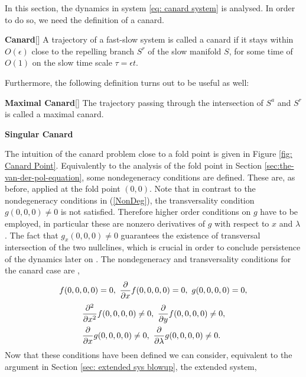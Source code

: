 In this section, the dynamics in system \ref{eq: canard system} is analysed. In order to do so, we need the definition of a canard.
\begin{definition}{\textbf{ Canard}}[\citealp{Kuehn}]
A trajectory of a fast-slow system is called a canard if it stays within $O(\epsilon)$ close to the repelling branch $S^r$ of the slow manifold $S$, for some time of $O(1)$ on the slow time scale $\tau = \epsilon t$.
\end{definition}
Furthermore, the following definition turns out to be useful as well:
\begin{definition}{\textbf{Maximal Canard}}[\citealp{Kuehn}] \label{maxcanard}
The trajectory passing through the intersection of $S^a$ and $S^r$ is called a maximal canard. 
\end{definition}
\begin{definition}{\textbf{Singular Canard}}
\end{definition}
The intuition of the canard problem close to a fold point is given in Figure \ref{fig: Canard Point}.
Equivalently to the analysis of the fold point in Section \ref{sec:the-van-der-pol-equation}, some nondegeneracy conditions are defined. These are, as before, applied at the fold point $(0,0)$. Note that in contrast to the nondegeneracy conditions in (\ref{NonDeg}), the transversality condition $g(0,0,0) \neq 0$ is not satisfied. Therefore higher order conditions on $g$ have to be employed, in particular these are nonzero derivatives of $g$ with respect to $x$ and $\lambda$. The fact that $g_x(0,0,0) \neq 0$ guarantees the existence of transversal intersection of the two nullclines, which is crucial in order to conclude persistence of the dynamics later on \citep{kuehn}. 
The nondegeneracy and transversality conditions for the canard case are  \citep{krupa2001},
\begin{equation}
f(0,0,0,0)=0, \ \pd{}{x}f(0,0,0,0)=0, \ g(0,0,0,0)=0, \label{eq: canard sing condition}
\end{equation}
\begin{equation}
\begin{aligned}
&\pd{^2}{x^2}f(0,0,0,0)\neq 0, \ \pd{}{y}f(0,0,0,0)\neq 0,\\
&\pd{}{x}g(0,0,0,0)\neq 0, \ \pd{}{\lambda}g(0,0,0,0)\neq 0. \label{eq: canard non-d condition}
\end{aligned}
\end{equation}
Now that these conditions have been defined we can consider, equivalent to the argument in Section \ref{sec: extended sys blowup}, the extended \vdp system,
